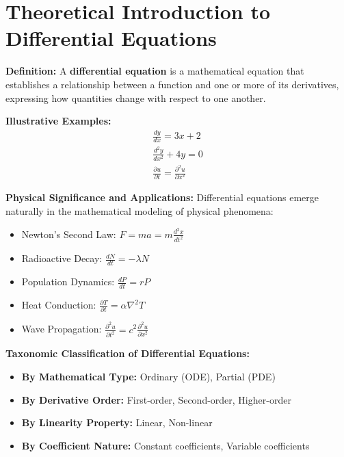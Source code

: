 \documentclass[12pt, letterpaper]{book}
\begin{document}
\section{Theoretical Introduction to Differential Equations}
\textbf{Definition:}
A \textbf{differential equation} is a mathematical equation that establishes a relationship between a function and one or more of its derivatives, expressing how quantities change with respect to one another.

\textbf{Illustrative Examples:}
\begin{align*}
    \frac{dy}{dx} = 3x + 2 \\  %
    \frac{d^2y}{dx^2} + 4y = 0 \\  %
    \frac{\partial u}{\partial t} = \frac{\partial^2 u}{\partial x^2}  %
\end{align*}

\textbf{Physical Significance and Applications:}
Differential equations emerge naturally in the mathematical modeling of physical phenomena:
\begin{itemize}
    \item Newton's Second Law: $F = ma = m\frac{d^2x}{dt^2}$
    \item Radioactive Decay: $\frac{dN}{dt} = -\lambda N$
    \item Population Dynamics: $\frac{dP}{dt} = rP$
    \item Heat Conduction: $\frac{\partial T}{\partial t} = \alpha \nabla^2 T$
    \item Wave Propagation: $\frac{\partial^2 u}{\partial t^2} = c^2 \frac{\partial^2 u}{\partial x^2}$
\end{itemize}

\textbf{Taxonomic Classification of Differential Equations:}
\begin{itemize}
    \item \textbf{By Mathematical Type:} Ordinary (ODE), Partial (PDE)
    \item \textbf{By Derivative Order:} First-order, Second-order, Higher-order
    \item \textbf{By Linearity Property:} Linear, Non-linear
    \item \textbf{By Coefficient Nature:} Constant coefficients, Variable coefficients
\end{itemize}
\end{document}
